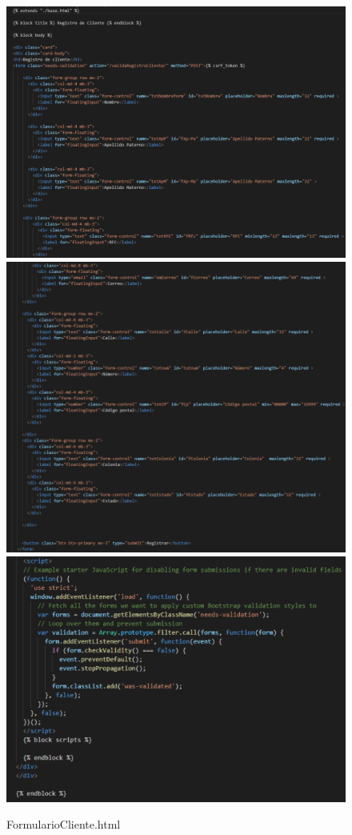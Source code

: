 \documentclass[12pt,letterpaper]{article}
\begin{document}
	\begin{figure}[H]
		\centering
		\includegraphics[scale=0.55]{Documentacion/img/lineasFormularioCliente.png}
		\includegraphics[scale=0.55]{Documentacion/img/lineasFormularioCliente2.png}
		\includegraphics[scale=0.55]{Documentacion/img/lineasFormularioCliente3.png}
		\caption{FormularioCliente.html}
	\end{figure}
	
\end{document}
